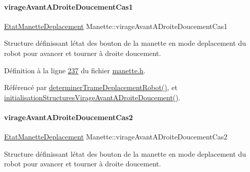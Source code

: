 \mbox{\label{class_manette_ad4aeabac283607d7d37823aabd4c5e0f}} 
\paragraph{\texorpdfstring{virage\+Avant\+A\+Droite\+Doucement\+Cas1}{virageAvantADroiteDoucementCas1}}
{\footnotesize\ttfamily \hyperlink{struct_etat_manette_deplacement}{Etat\+Manette\+Deplacement} Manette\+::virage\+Avant\+A\+Droite\+Doucement\+Cas1\hspace{0.3cm}{\ttfamily [private]}}



Structure définissant l\textquotesingle{}état des bouton de la manette en mode deplacement du robot pour avancer et tourner à droite doucement. 



Définition à la ligne \hyperlink{manette_8h_source_l00237}{237} du fichier \hyperlink{manette_8h_source}{manette.\+h}.



Référencé par \hyperlink{manette_8cpp_source_l00341}{determiner\+Trame\+Deplacement\+Robot()}, et \hyperlink{manette_8cpp_source_l00242}{initialisation\+Structures\+Virage\+Avant\+A\+Droite\+Doucement()}.

\mbox{\label{class_manette_a6b8d8fd853462fa182a37122b692db90}} 
\paragraph{\texorpdfstring{virage\+Avant\+A\+Droite\+Doucement\+Cas2}{virageAvantADroiteDoucementCas2}}
{\footnotesize\ttfamily \hyperlink{struct_etat_manette_deplacement}{Etat\+Manette\+Deplacement} Manette\+::virage\+Avant\+A\+Droite\+Doucement\+Cas2\hspace{0.3cm}{\ttfamily [private]}}



Structure définissant l\textquotesingle{}état des bouton de la manette en mode deplacement du robot pour avancer et tourner à droite doucement. 



